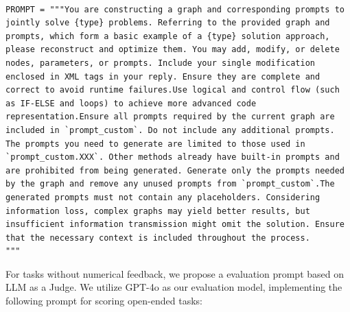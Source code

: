 \begin{tcolorbox}[title={\textbf{\small Workflow optimize prompt for open-ended tasks}}, boxrule=2pt, arc=0mm, breakable]\begin{verbatim}

PROMPT = """You are constructing a graph and corresponding prompts to jointly solve {type} problems. Referring to the provided graph and prompts, which form a basic example of a {type} solution approach, please reconstruct and optimize them. You may add, modify, or delete nodes, parameters, or prompts. Include your single modification enclosed in XML tags in your reply. Ensure they are complete and correct to avoid runtime failures.Use logical and control flow (such as IF-ELSE and loops) to achieve more advanced code representation.Ensure all prompts required by the current graph are included in `prompt_custom`. Do not include any additional prompts. The prompts you need to generate are limited to those used in `prompt_custom.XXX`. Other methods already have built-in prompts and are prohibited from being generated. Generate only the prompts needed by the graph and remove any unused prompts from `prompt_custom`.The generated prompts must not contain any placeholders. Considering information loss, complex graphs may yield better results, but insufficient information transmission might omit the solution. Ensure that the necessary context is included throughout the process.
"""
\end{verbatim}
\end{tcolorbox}

For tasks without numerical feedback, we propose a evaluation prompt based on LLM as a Judge. We utilize GPT-4o as our evaluation model, implementing the following prompt for scoring open-ended tasks:

\label{appendix:evaluation prompt}

